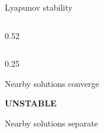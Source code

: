 \begin{frame}{Lyapunov stability}
\begin{columns}[c,onlytextwidth]
\begin{column}{0.52\textwidth}
\begin{columns}[c,onlytextwidth]
\begin{column}{0.25\linewidth}
\begin{minipage}[c][2.80cm][c]{\linewidth}
              {\color{HydraMuted}
                \fontsize{7.2}{9}\selectfont
                Nearby solutions converge
              \par}
            \end{minipage}

            \vspace{0.12cm}

            \begin{minipage}[c][2.80cm][c]{\linewidth}
              {\color{HydraGold}\bfseries
                \fontsize{7.7}{9.2}\selectfont
                UNSTABLE
              \par}

              \vspace{0.08cm}

              {\color{HydraMuted}
                \fontsize{7.2}{9}\selectfont
                Nearby solutions separate
              \par}
            \end{minipage}

          \end{column}

        \end{columns}


    \end{column}

  \end{columns}

\end{frame}

